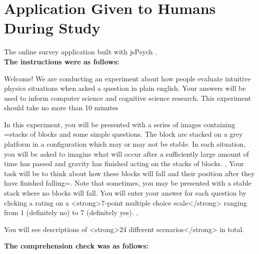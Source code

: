 \documentclass[10pt,letterpaper]{article}
\begin{document}
\setlength{\bibleftmargin}{.125in}
\setlength{\bibindent}{-\bibleftmargin}

%


\onecolumn
\appendix

\section{Application Given to Humans During Study}
\label{app:human_app}

The online survey application built with jsPsych \cite{de2023jspsych}. 
\\

\textbf{The instructions were as follows:}

\begin{displayquote}

    Welcome!     We are conducting an experiment about how people evaluate intuitive physics situations when asked a question in plain english. Your answers will be used to inform computer science and cognitive science research.      
          This experiment should take no more than 10 minutes
          
         In this experiment, you will be presented with a series of images containing =stacks of blocks and some simple questions.    
       The block are stacked on a grey platform in a configuration which may or may not be stable.     
       In each situation, you will be asked to imagine what will occur after a sufficiently large amount of time has passed and gravity has finished acting on the stacks of blocks.  ,
       Your task will be to think about how these blocks will fall and their position after they have finished falling=. Note that sometimes, you may be presented with a stable stack where no blocks will fall.    
       You will enter your answer for each question by clicking a rating on a <strong>7-point multiple choice scale</strong> ranging from 1 (definitely no) to 7 (definitely yes).  ,

       You will see descriptions of <strong>24  different scenarios</strong> in total.     

\end{displayquote}

\textbf{The comprehension check was as follows:}
\end{document}
